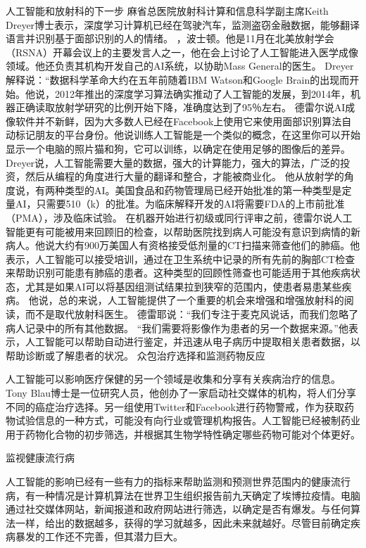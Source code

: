 人工智能和放射科的下一步
麻省总医院放射科计算和信息科学副主席Keith Dreyer博士表示，深度学习计算机已经在驾驶汽车，监测盗窃金融数据，能够翻译语言并识别基于面部识别的人的情绪。 ，波士顿。他是11月在北美放射学会（RSNA）开幕会议上的主要发言人之一，他在会上讨论了人工智能进入医学成像领域。他还负责其机构开发自己的AI系统，以协助Mass General的医生。
Dreyer解释说：“数据科学革命大约在五年前随着IBM Watson和Google Brain的出现而开始。他说，2012年推出的深度学习算法确实推动了人工智能的发展，到2014年，机器正确读取放射学研究的比例开始下降，准确度达到了95％左右。
德雷尔说AI成像软件并不新鲜，因为大多数人已经在Facebook上使用它来使用面部识别算法自动标记朋友的平台身份。他说训练人工智能是一个类似的概念，在这里你可以开始显示一个电脑的照片猫和狗，它可以训练，以确定在使用足够的图像后的差异。
Dreyer说，人工智能需要大量的数据，强大的计算能力，强大的算法，广泛的投资，然后从编程的角度进行大量的翻译和整合，才能被商业化。
他从放射学的角度说，有两种类型的AI。美国食品和药物管理局已经开始批准的第一种类型是定量AI，只需要510（k）的批准。为临床解释开发的AI将需要FDA的上市前批准（PMA），涉及临床试验。
在机器开始进行初级或同行评审之前，德雷尔说人工智能更有可能被用来回顾旧的检查，以帮助医院找到病人可能没有意识到病情的新病人。他说大约有900万美国人有资格接受低剂量的CT扫描来筛查他们的肺癌。他表示，人工智能可以接受培训，通过在卫生系统中记录的所有先前的胸部CT检查来帮助识别可能患有肺癌的患者。这种类型的回顾性筛查也可能适用于其他疾病状态，尤其是如果AI可以将基因组测试结果拉到狭窄的范围内，使患者易患某些疾病。
他说，总的来说，人工智能提供了一个重要的机会来增强和增强放射科的阅读，而不是取代放射科医生。
德雷耶说：“我们专注于麦克风说话，而我们忽略了病人记录中的所有其他数据。 “我们需要将影像作为患者的另一个数据来源。”他表示，人工智能可以帮助自动进行鉴定，并迅速从电子病历中提取相关患者数据，以帮助诊断或了解患者的状况。
众包治疗选择和监测药物反应

人工智能可以影响医疗保健的另一个领域是收集和分享有关疾病治疗的信息。 Tony Blau博士是一位研究人员，他创办了一家启动社交媒体的机构，将人们分享不同的癌症治疗选择。另一组使用Twitter和Facebook进行药物警戒，作为获取药物试验信息的一种方式，可能没有向行业或管理机构报告。人工智能已经被制药业用于药物化合物的初步筛选，并根据其生物学特性确定哪些药物可能对个体更好。

监视健康流行病

人工智能的影响已经有一些有力的指标来帮助监测和预测世界范围内的健康流行病，有一种情况是计算机算法在世界卫生组织报告前九天确定了埃博拉疫情。电脑通过社交媒体网站，新闻报道和政府网站进行筛选，以确定是否有爆发。与任何算法一样，给出的数据越多，获得的学习就越多，因此未来就越好。尽管目前确定疾病暴发的工作还不完善，但其潜力巨大。

